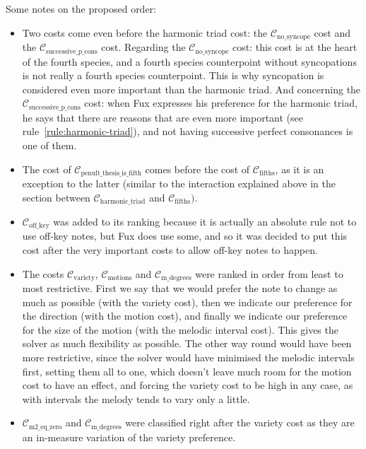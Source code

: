 Some notes on the proposed order: 
\begin{itemize}
    \item Two costs come even before the harmonic triad cost: the $\mathcal{C}_\text{no\_syncope}$ cost and the $\mathcal{C}_\text{successive\_p\_cons}$ cost. Regarding the $\mathcal{C}_\text{no\_syncope}$ cost: this cost is at the heart of the fourth species, and a fourth species counterpoint without syncopations is not really a fourth species counterpoint. This is why syncopation is considered even more important than the harmonic triad. And concerning the $\mathcal{C}_\text{successive\_p\_cons}$ cost: when Fux expresses his preference for the harmonic triad, he says that there are reasons that are even more important (see rule~\ref{rule:harmonic-triad}), and not having successive perfect consonances is one of them.
    \item The cost of $\mathcal{C}_\text{penult\_thesis\_is\_fifth}$ comes before the cost of $\mathcal{C}_\text{fifths}$, as it is an exception to the latter (similar to the interaction explained above in the section between $\mathcal{C}_\text{harmonic\_triad}$ and $\mathcal{C}_\text{fifths})$.
    
    \item $\mathcal{C}_\text{off\_key}$ was added to its ranking because it is actually an absolute rule not to use off-key notes, but Fux does use some, and so it was decided to put this cost after the very important costs to allow off-key notes to happen.

    \item The costs $\mathcal{C}_\text{variety}$, $\mathcal{C}_\text{motions}$ and $\mathcal{C}_\text{m\_degrees}$ were ranked in order from least to most restrictive. First we say that we would prefer the note to change as much as possible (with the variety cost), then we indicate our preference for the direction (with the motion cost), and finally we indicate our preference for the size of the motion (with the melodic interval cost). This gives the solver as much flexibility as possible. The other way round would have been more restrictive, since the solver would have minimised the melodic intervals first, setting them all to one, which doesn't leave much room for the motion cost to have an effect, and forcing the variety cost to be high in any case, as with  intervals the melody tends to vary only a little.
    
    \item $\mathcal{C}_\text{m2\_eq\_zero}$ and $\mathcal{C}_\text{m\_degrees}$ were classified right after the variety cost as they are an in-measure variation of the variety preference.

\end{itemize}


